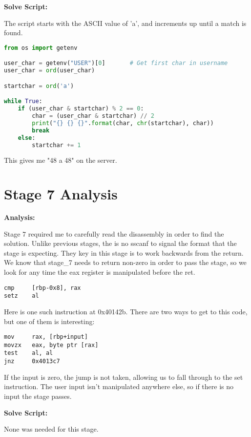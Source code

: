 \documentclass{article}
\begin{document}
\begin{flushleft}
\textbf{Solve Script:}
\vspace{.5pc}
\end{flushleft}
\par
The script starts with the ASCII value of 'a', and increments up until a match
is found.
\begin{lstlisting}[language=Python]
from os import getenv

user_char = getenv("USER")[0]       # Get first char in username
user_char = ord(user_char)

startchar = ord('a')

while True:
    if (user_char & startchar) % 2 == 0:
        char = (user_char & startchar) // 2
        print("{} {} {}".format(char, chr(startchar), char))
        break
    else:
        startchar += 1
\end{lstlisting}
\par
This gives me "48 a 48" on the server.

\newpage
\section{Stage 7 Analysis}
\begin{flushleft}
\vspace{.5pc}
\end{flushleft}

\begin{flushleft}
\textbf{Analysis:}
\vspace{.5pc}
\end{flushleft}
\par
Stage 7 required me to carefully read the disassembly in order to find the 
solution.  Unlike previous stages, the is no sscanf to signal the format that
the stage is expecting.  They key in this stage is to work backwards from the
return.  We know that stage\_7 needs to return non-zero in order to pass the
stage, so we look for any time the eax register is manipulated before the ret.
\begin{lstlisting}
cmp     [rbp-0x8], rax
setz    al
\end{lstlisting}
Here is one such instruction at 0x40142b.  There are two ways to get to this 
code, but one of them is interesting:
\begin{lstlisting}
mov     rax, [rbp+input]
movzx   eax, byte ptr [rax]
test    al, al
jnz     0x4013c7
\end{lstlisting}
\par
If the input is zero, the jump is not taken, allowing us to fall through to 
the set instruction.  The user input isn't manipulated anywhere else, so if
there is no input the stage passes.
\begin{flushleft}
\textbf{Solve Script:}
\vspace{.5pc}
\end{flushleft}
\par
None was needed for this stage.  
\end{document}

